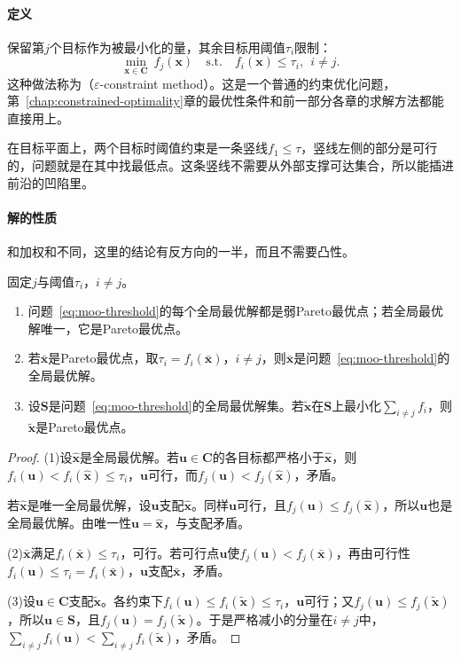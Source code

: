 \paragraph{定义}
保留第$j$个目标作为被最小化的量，其余目标用阈值$\tau_i$限制：
\begin{equation}
 \min_{\bm{x}\in\bm{C}}\ f_j(\bm{x})
 \quad\text{s.t.}\quad f_i(\bm{x})\leq\tau_i,\ \ i\neq j.
 \label{eq:moo-threshold}
\end{equation}
这种做法称为（$\varepsilon$-constraint method）。这是一个普通的约束优化问题，第~\ref{chap:constrained-optimality}章的最优性条件和前一部分各章的求解方法都能直接用上。

在目标平面上，两个目标时阈值约束是一条竖线$f_1\leq\tau$，竖线左侧的部分是可行的，问题就是在其中找最低点。这条竖线不需要从外部支撑可达集合，所以能插进前沿的凹陷里。

\paragraph{解的性质}
和加权和不同，这里的结论有反方向的一半，而且不需要凸性。

\begin{theorem}[阈值约束的解]
\label{thm:moo-threshold}
固定$j$与阈值$\tau_i$，$i\neq j$。
\begin{enumerate}
 \item 问题~\eqref{eq:moo-threshold}的每个全局最优解都是弱Pareto最优点；若全局最优解唯一，它是Pareto最优点。
 \item 若$\bar{\bm{x}}$是Pareto最优点，取$\tau_i=f_i(\bar{\bm{x}})$，$i\neq j$，则$\bar{\bm{x}}$是问题~\eqref{eq:moo-threshold}的全局最优解。
 \item 设$\bm{S}$是问题~\eqref{eq:moo-threshold}的全局最优解集。若$\tilde{\bm{x}}$在$\bm{S}$上最小化$\sum_{i\neq j}f_i$，则$\tilde{\bm{x}}$是Pareto最优点。
\end{enumerate}
\end{theorem}

\begin{proof}
(1)设$\hat{\bm{x}}$是全局最优解。若$\bm{u}\in\bm{C}$的各目标都严格小于$\hat{\bm{x}}$，则$f_i(\bm{u})<f_i(\hat{\bm{x}})\leq\tau_i$，$\bm{u}$可行，而$f_j(\bm{u})<f_j(\hat{\bm{x}})$，矛盾。

若$\hat{\bm{x}}$是唯一全局最优解，设$\bm{u}$支配$\hat{\bm{x}}$。同样$\bm{u}$可行，且$f_j(\bm{u})\leq f_j(\hat{\bm{x}})$，所以$\bm{u}$也是全局最优解。由唯一性$\bm{u}=\hat{\bm{x}}$，与支配矛盾。

(2)$\bar{\bm{x}}$满足$f_i(\bar{\bm{x}})\leq\tau_i$，可行。若可行点$\bm{u}$使$f_j(\bm{u})<f_j(\bar{\bm{x}})$，再由可行性$f_i(\bm{u})\leq\tau_i=f_i(\bar{\bm{x}})$，$\bm{u}$支配$\bar{\bm{x}}$，矛盾。

(3)设$\bm{u}\in\bm{C}$支配$\tilde{\bm{x}}$。各约束下$f_i(\bm{u})\leq f_i(\tilde{\bm{x}})\leq\tau_i$，$\bm{u}$可行；又$f_j(\bm{u})\leq f_j(\tilde{\bm{x}})$，所以$\bm{u}\in\bm{S}$，且$f_j(\bm{u})=f_j(\tilde{\bm{x}})$。于是严格减小的分量在$i\neq j$中，$\sum_{i\neq j}f_i(\bm{u})<\sum_{i\neq j}f_i(\tilde{\bm{x}})$，矛盾。
\end{proof}

